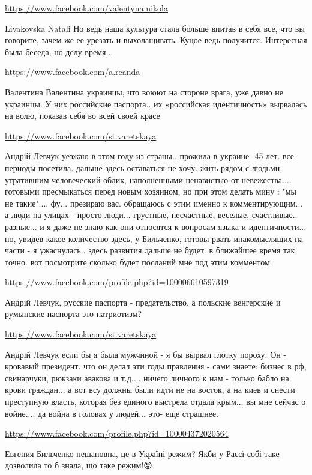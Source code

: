 \documentclass[a4paper,11pt]{extreport}
\begin{document}
\begin{itemize}
\begin{itemize}
\url{https://www.facebook.com/valentyna.nikola}

Livakovska Natali Но ведь наша культура стала больше впитав в себя все, что вы говорите, зачем же ее урезать и выхолащивать. Куцое ведь получится.
Интересная была беседа, но делу время...

\url{https://www.facebook.com/a.reanda}

Валентина Валентина украинцы, что воюют на стороне врага, уже давно не украинцы. У них российские паспорта.. их «российская идентичность» вырвалась на волю, показав себя во всей своей красе

\url{https://www.facebook.com/st.varetskaya}

Андрій Левчук уезжаю в этом году из страны.. прожила в украине -45 лет. все периоды посетила. дальше здесь оставаться не хочу. жить рядом с людьми, утратившим человеческий облик, наполненными ненавистью от невежества.... готовыми пресмыкаться перед новым хозяином, но при этом делать мину : "мы не такие".... фу... презираю вас.
обращаюсь с этим именно к комментирующим...
а люди на улицах - просто люди... грустные, несчастные, веселые, счастливые.. разные... и я даже не знаю как они относятся к вопросам языка и идентичности... но, увидев какое количество здесь, у Бильченко, готовы рвать инакомыслящих на части - я ужаснулась.. здесь развития дальше не будет. в ближайшее время так точно.
вот посмотрите сколько будет посланий мне под этим комментом.

\url{https://www.facebook.com/profile.php?id=100006610597319}

Андрій Левчук, русские паспорта - предательство, а польские венгерские и румынские паспорта это патриотизм?

\url{https://www.facebook.com/st.varetskaya}

Андрій Левчук если бы я была мужчиной - я бы вырвал глотку пороху. Он - кровавый президент. что он делал эти годы правления - сами знаете: бизнес в рф, свинарчуки, рюкзаки авакова и т.д.... ничего личного к нам - только бабло на крови граждан... а вот всу должны были идти не на восток, а на киев и снести преступную власть, которая без единого выстрела отдала крым...
вы мне сейчас о войне.... да война в головах у людей... это- еще страшнее.

\url{https://www.facebook.com/profile.php?id=100004372020564}

Евгения Бильченко нешановна, це в Україні режим? Якби у Расєї собі таке дозволила то б знала, що таке режим!😡


\end{itemize}
\end{itemize}
\end{document}
